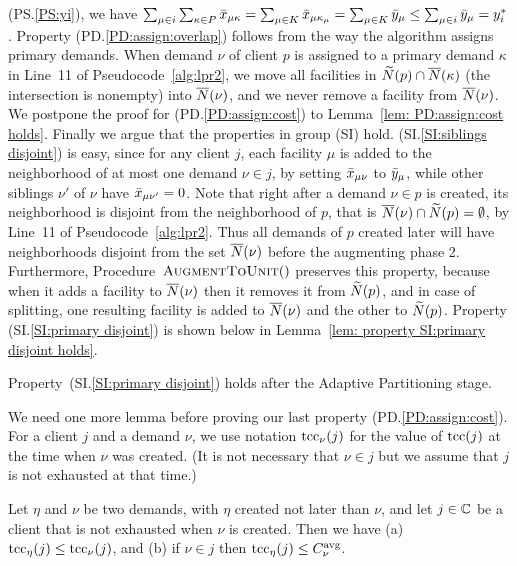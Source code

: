 \documentclass[11pt]{article}
\begin{document}
(PS.\ref{PS:yi}), we have $ \sum_{\mu\in i}\sum_{\kappa\in
  P}{\bar x}_{\mu\kappa} = \sum_{\mu\in K}{\bar x}_{\mu\kappa_\mu} =
\sum_{\mu\in K}{\bar y}_{\mu} \leq \sum_{\mu\in i} {\bar y}_{\mu} =
y_i^\ast$. Property (PD.\ref{PD:assign:overlap}) follows from the way
the algorithm assigns primary demands.  When demand $\nu$ of client
$p$ is assigned to a primary demand $\kappa$ in Line~11 of
Pseudocode~\ref{alg:lpr2}, we move all facilities in ${\widetilde N}(p)\cap
{\overline{N}}(\kappa)$ (the intersection is nonempty) into ${\overline{N}}(\nu)$, and
we never remove a facility from ${\overline{N}}(\nu)$.  We postpone the proof
for (PD.\ref{PD:assign:cost}) to Lemma~\ref{lem: PD:assign:cost
  holds}. Finally we argue that the properties in group (SI)
hold. (SI.\ref{SI:siblings disjoint}) is easy, since for any client
$j$, each facility $\mu$ is added to the neighborhood of at most one
demand $\nu\in j$, by setting ${\bar x}_{\mu\nu}$ to ${\bar y}_\mu$, while
other siblings $\nu'$ of $\nu$ have ${\bar x}_{\mu\nu'}=0$. Note that
right after a demand $\nu\in p$ is created, its neighborhood is
disjoint from the neighborhood of $p$, that is ${\overline{N}}(\nu)\cap
{\widetilde N}(p) = \emptyset$, by Line~11 of
Pseudocode~\ref{alg:lpr2}. Thus all demands of $p$ created later will
have neighborhoods disjoint from the set ${\overline{N}}(\nu)$ before the
augmenting phase 2. Furthermore, Procedure~${\textsc{AugmentToUnit}}()$
preserves this property, because when it adds a facility to
${\overline{N}}(\nu)$ then it removes it from ${\widetilde N}(p)$, and in case of
splitting, one resulting facility is added to ${\overline{N}}(\nu)$ and the
other to ${\widetilde N}(p)$. Property (SI.\ref{SI:primary disjoint}) is
shown below in Lemma~\ref{lem: property SI:primary disjoint holds}.


\begin{lemma}\label{lem: property SI:primary disjoint holds}
  Property~(SI.\ref{SI:primary disjoint}) holds after the
  Adaptive Partitioning stage.
\end{lemma}

We need one more lemma before proving our last property
(PD.\ref{PD:assign:cost}).  For a client $j$ and a demand
$\nu$, we use notation $\textrm{tcc}_{\nu}(j)$ for the value of
$\textrm{tcc}(j)$ at the time when $\nu$ was created. (It is not
necessary that $\nu\in j$ but we assume that $j$ is not
exhausted at that time.)


\begin{lemma}\label{lem: tcc optimal}
  Let $\eta$ and $\nu$ be two demands, with $\eta$ created not later
  than $\nu$, and let $j\in\mathbb{C}$ be a client that is not
  exhausted when $\nu$ is created. Then we have (a) $\textrm{tcc}_\eta(j) \le
  \textrm{tcc}_{\nu}(j)$, and (b) if $\nu\in j$ then $\textrm{tcc}_\eta(j) \le
  C^{{\mbox{\scriptsize\rm avg}}}_{\nu}$.

\end{lemma}
\end{document}
